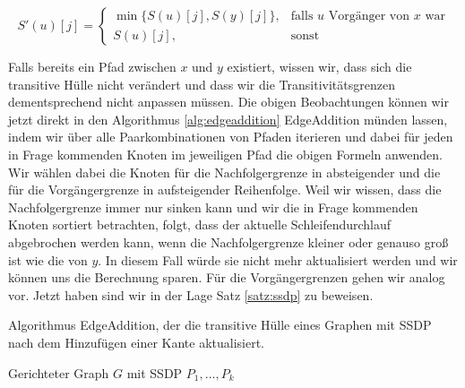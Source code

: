 \begin{equation}
	S'(u)[j] = \begin{cases}
			\min\{S(u)[j], S(y)[j]\}, & \text{falls $u$ Vorgänger von $x$ war} \\
			S(u)[j], & \text{sonst}
		\end{cases}
\end{equation}

Falls bereits ein Pfad zwischen $x$ und $y$ existiert, wissen wir, dass sich die transitive Hülle nicht verändert und dass wir die Transitivitätsgrenzen dementsprechend nicht anpassen müssen. Die obigen Beobachtungen können wir jetzt direkt in den Algorithmus \ref{alg:edgeaddition} \textrm{EdgeAddition} münden lassen, indem wir über alle Paarkombinationen von Pfaden iterieren und dabei für jeden in Frage kommenden Knoten im jeweiligen Pfad die obigen Formeln anwenden. Wir wählen dabei die Knoten für die Nachfolgergrenze in absteigender und die für die Vorgängergrenze in aufsteigender Reihenfolge. Weil wir wissen, dass die Nachfolgergrenze immer nur sinken kann und wir die in Frage kommenden Knoten sortiert betrachten, folgt, dass der aktuelle Schleifendurchlauf abgebrochen werden kann, wenn die Nachfolgergrenze kleiner oder genauso groß ist wie die von $y$. In diesem Fall würde sie nicht mehr aktualisiert werden und wir können uns die Berechnung sparen. Für die Vorgängergrenzen gehen wir analog vor. Jetzt haben sind wir in der Lage Satz \ref{satz:ssdp} zu beweisen.

\begin{breakablealgorithm}
	\caption{Algorithmus EdgeAddition, der die transitive Hülle eines Graphen mit SSDP nach dem Hinzufügen einer Kante aktualisiert.}
	\label{alg:edgeaddition}
	\begin{algorithmic}[1]
		\Require Gerichteter Graph $G$ mit SSDP $P_1, \dots, P_k$
			\label{alg:pathIf}
							 \label{alg:succ_if}
								\label{algl:succ}
							\Else
							\EndIf
							 \label{alg:pred_if}
								\label{algl:pred}
							\Else
							\EndIf
			\EndIf
		\EndProcedure
	\end{algorithmic}
\end{breakablealgorithm}

